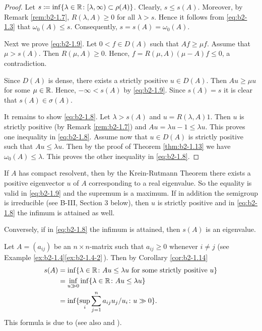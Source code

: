 \begin{proof}
Let $s \coloneqq \inf\{\lambda \in \mathbb{R} \colon [\lambda,\infty) \subset \rho(A)\}$.
Clearly, $s \leq s(A)$.
Moreover, by Remark \ref{rem:b2-1.7}, $R(\lambda,A) \geq 0$ for all $\lambda > s$.
Hence it follows from \eqref{eq:b2-1.3} that $\omega_{0}(A) \leq s$.
Consequently, $s = s(A) = \omega_{0}(A)$.

Next we prove \eqref{eq:b2-1.9}.
Let $0 < f \in D(A)$ such that $Af \geq \mu f$.
Assume that $\mu > s(A)$.
Then $R(\mu,A) \geq 0$.
Hence, $f = R(\mu,A)(\mu-A)f \leq 0$, a contradiction.

Since $D(A)$ is dense, there exists a strictly positive $u \in D(A)$.
Then $Au \geq \mu u$ for some $\mu \in \mathbb{R}$.
Hence, $-\infty < s(A)$ by \eqref{eq:b2-1.9}. 
Since $s(A) = s$ it is clear that $s(A) \in \sigma(A)$.

It remains to show \eqref{eq:b2-1.8}. 
Let $\lambda > s(A)$ and $u = R(\lambda,A)1$.
Then $u$ is strictly positive (by  Remark \ref{rem:b2-1.7}) and $Au = \lambda u - 1 \leq \lambda u$.
This proves one inequality in \eqref{eq:b2-1.8}. 
Assume now that $u \in D(A)$ is strictly positive such that $Au \leq \lambda u$.
Then by the proof of Theorem \ref{thm:b2-1.13} we have $\omega_{0}(A) \leq \lambda$.
This proves the other inequality in \eqref{eq:b2-1.8}. 
\end{proof}

\begin{remark}\label{rem:b2-1.15}
If $A$ has compact resolvent, then by the Krein-Rutmann Theorem there exists a positive eigenvector $u$ of $A$ corresponding to a real eigenvalue.
So the equality is valid in \eqref{eq:b2-1.9}  
and the supremum is a maximum.
If in addition the semigroup is irreducible (see B-III, Section 3 below), then $u$ is strictly positive and in \eqref{eq:b2-1.8} 
the infimum is attained as well.

Conversely, if in \eqref{eq:b2-1.8} 
the infimum is attained, then $s(A)$ is an eigenvalue.
\end{remark}
\begin{example}\label{ex:b2-1.16}
Let $A = (a_{ij})$ be an $n \times n$-matrix such that $a_{ij} \geq 0$ whenever $i \neq j$ (see Example \ref{ex:b2-1.4}\ref{ex:b2-1.4-2}\,).
Then by Corollary \ref{cor:b2-1.14} 
\begin{align*}
    s(A) &= \inf\{\lambda \in \mathbb{R} \colon Au \leq \lambda u \text{ for some strictly positive } u\} \\
    &= \inf_{u \gg 0} \inf\{\lambda \in \mathbb{R} \colon Au \leq \lambda u\} \\
    &= \inf\{\sup_{i} \sum_{j=1}^{n} a_{ij} u_{j}/u_{i} \colon u \gg 0\}.
\end{align*}
This formula is due to \citet{collatz:1942} (see also \citet[Chapter I, Exercise 20]{schaefer:1974} and \citet{wielandt:1950}).
\end{example}

